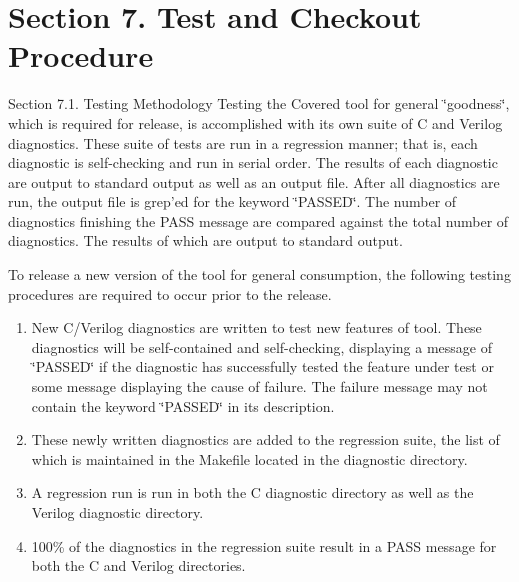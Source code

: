 \section{Section 7.  Test and Checkout Procedure}\label{page_testing}
\begin{Desc}
\item[Section 7.1. Testing Methodology]Testing the Covered tool for general \char`\"{}goodness\char`\"{}, which is required for release, is accomplished with its own suite of C and Verilog diagnostics. These suite of tests are run in a regression manner; that is, each diagnostic is self-checking and run in serial order. The results of each diagnostic are output to standard output as well as an output file. After all diagnostics are run, the output file is grep'ed for the keyword \char`\"{}PASSED\char`\"{}. The number of diagnostics finishing the PASS message are compared against the total number of diagnostics. The results of which are output to standard output.\end{Desc}
\begin{Desc}
\item[]To release a new version of the tool for general consumption, the following testing procedures are required to occur prior to the release.\begin{enumerate}
\item New C/Verilog diagnostics are written to test new features of tool. These diagnostics will be self-contained and self-checking, displaying a message of \char`\"{}PASSED\char`\"{} if the diagnostic has successfully tested the feature under test or some message displaying the cause of failure. The failure message may not contain the keyword \char`\"{}PASSED\char`\"{} in its description.\item These newly written diagnostics are added to the regression suite, the list of which is maintained in the Makefile located in the diagnostic directory.\item A regression run is run in both the C diagnostic directory as well as the Verilog diagnostic directory.\item 100\% of the diagnostics in the regression suite result in a PASS message for both the C and Verilog directories.\end{enumerate}
\end{Desc}




